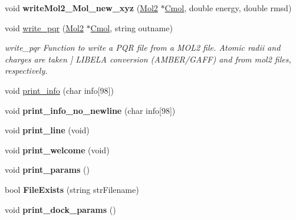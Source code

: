 \begin{DoxyCompactItemize}
\item 
\hypertarget{classWRITER_a60c384c4332ce8fdce7ce1b88abfc4ce}{
void {\bfseries writeMol2\_\-Mol\_\-new\_\-xyz} (\hyperlink{classMol2}{Mol2} $\ast$\hyperlink{classWRITER_aaea0524b142c7c6e27082d070b5ba95c}{Cmol}, double energy, double rmsd)}
\label{classWRITER_a60c384c4332ce8fdce7ce1b88abfc4ce}

\item 
void \hyperlink{classWRITER_ae7b3e548525f5fe8dd27b228f5c0eb63}{write\_\-pqr} (\hyperlink{classMol2}{Mol2} $\ast$\hyperlink{classWRITER_aaea0524b142c7c6e27082d070b5ba95c}{Cmol}, string outname)
\begin{DoxyCompactList}\small\item\em write\_\-pqr Function to write a PQR file from a MOL2 file. Atomic radii and charges are taken \mbox{]} LIBELA conversion (AMBER/GAFF) and from mol2 files, respectively. \item\end{DoxyCompactList}\item 
void \hyperlink{classWRITER_a11c7d32eb43e430e5d27eb219465a076}{print\_\-info} (char info\mbox{[}98\mbox{]})
\item 
\hypertarget{classWRITER_a9e601b63788f9c708df7d6e61885da4b}{
void {\bfseries print\_\-info\_\-no\_\-newline} (char info\mbox{[}98\mbox{]})}
\label{classWRITER_a9e601b63788f9c708df7d6e61885da4b}

\item 
\hypertarget{classWRITER_ae4ddcacf87db8082ac1db1314596a540}{
void {\bfseries print\_\-line} (void)}
\label{classWRITER_ae4ddcacf87db8082ac1db1314596a540}

\item 
\hypertarget{classWRITER_a8e00990a76c4759fe28660369b3caff6}{
void {\bfseries print\_\-welcome} (void)}
\label{classWRITER_a8e00990a76c4759fe28660369b3caff6}

\item 
\hypertarget{classWRITER_a10a69c452dc11bc6d8616ea0da5c94e7}{
void {\bfseries print\_\-params} ()}
\label{classWRITER_a10a69c452dc11bc6d8616ea0da5c94e7}

\item 
\hypertarget{classWRITER_a3ef855f75e7ddf4b99a2ab6792506279}{
bool {\bfseries FileExists} (string strFilename)}
\label{classWRITER_a3ef855f75e7ddf4b99a2ab6792506279}

\item 
\hypertarget{classWRITER_abe72a9aeaa5993a5b6439528656b91eb}{
void {\bfseries print\_\-dock\_\-params} ()}
\label{classWRITER_abe72a9aeaa5993a5b6439528656b91eb}

\end{DoxyCompactItemize}
